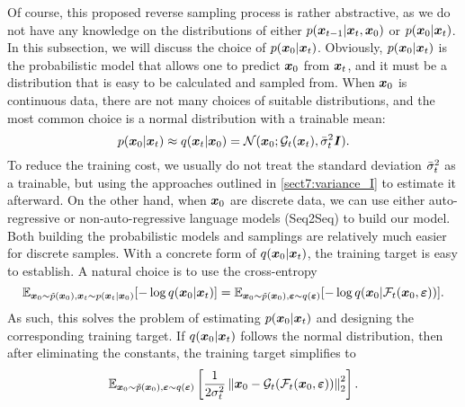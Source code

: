 Of course, this proposed reverse sampling process is rather abstractive, as we do not have any knowledge on the distributions of either $p(\bm{x}_{t-1}|\bm{x}_{t},\bm{x}_0)$ or $p(\bm{x}_0|\bm{x}_{t})$. In this subsection, we will discuss the choice of $p(\bm{x}_0|\bm{x}_{t})$. Obviously, $p(\bm{x}_0|\bm{x}_{t})$ is the probabilistic model that allows one to predict $\bm{x}_0$ from $\bm{x}_{t}$, and it must be a distribution that is easy to be calculated and sampled from. When $\bm{x}_0$ is continuous data, there are not many choices of suitable distributions, and the most common choice is a normal distribution with a trainable mean:
\begin{equation}
    \label{eq:10.4}
    p(\bm{x}_0|\bm{x}_{t})\approx q(\bm{x}_{t}|\bm{x}_0)=\mathcal{N}(\bm{x}_0;\mathcal{G}_{t}(\bm{x}_{t}),\bar{\sigma}_t^2\bm{I}).
\end{equation}
To reduce the training cost, we usually do not treat the standard deviation $\bar{\sigma}_t^2$ as a trainable, but using the approaches outlined in \cref{sect7:variance_I} to estimate it afterward. On the other hand, when $\bm{x}_0$ are discrete data, we can use either auto-regressive or non-auto-regressive language models (Seq2Seq) to build our model. Both building the probabilistic models and samplings are relatively much easier for discrete samples. With a concrete form of $q(\bm{x}_0|\bm{x}_{t})$, the training target is easy to establish. A natural choice is to use the cross-entropy
\begin{equation}
    \label{eq:10.5}
    \mathbb{E}_{\bm{x}_0\sim\tilde{p}(\bm{x}_0),\bm{x}_{t}\sim p(\bm{x}_{t}|\bm{x}_0)}[-\log q(\bm{x}_0|\bm{x}_{t})]=\mathbb{E}_{\bm{x}_0\sim\tilde{p}(\bm{x}_0),\bm{\varepsilon}\sim q(\bm{\varepsilon})}[-\log q(\bm{x}_0|\mathcal{F}_{t}(\bm{x}_0,\bm{\varepsilon}))].
\end{equation}
As such, this solves the problem of estimating $p(\bm{x}_0|\bm{x}_{t})$ and designing the corresponding training target. If $q(\bm{x}_0|\bm{x}_{t})$ follows the normal distribution, then after eliminating the constants, the training target simplifies to
\begin{equation}
    \label{eq:10.6}
\mathbb{E}_{\bm{x}_0\sim\tilde{p}(\bm{x}_0),\bm{\varepsilon}\sim q(\bm{\varepsilon})}\left[ \frac{1}{2\sigma_t^2}\left\| \bm{x}_0-\mathcal{G}_t(\mathcal{F}_{t} (\bm{x}_0,\bm{\varepsilon}) ) \right\|_2^2 \right].
\end{equation}

